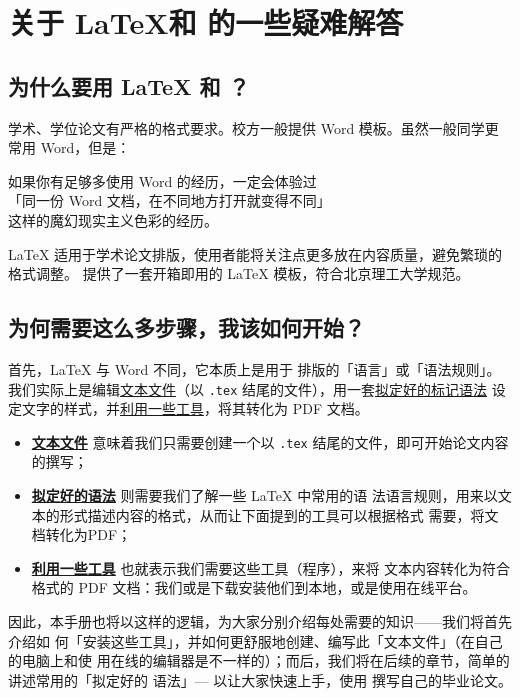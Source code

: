 \chapter{关于 \LaTeX 和 \BIThesis 的一些疑难解答}
\label{chap:what}

\section{为什么要用 \LaTeX{} 和 \BIThesis{}？}

学术、学位论文有严格的格式要求。校方一般提供 Word 模板。虽然一般同学更常用 Word，但是：
\begin{center}
  \kaishu
  如果你有足够多使用 Word 的经历，一定会体验过\\
  「同一份 Word 文档，在不同地方打开就变得不同」\\
  这样的魔幻现实主义色彩的经历。
\end{center}

\LaTeX{} 适用于学术论文排版，使用者能将关注点更多放在内容质量，避免繁琐的格式调整。
\BIThesis{} 提供了一套开箱即用的 \LaTeX{} 模板，符合北京理工大学规范。

\section{为何需要这么多步骤，我该如何开始？}

首先，\LaTeX{} 与 Word 不同，它本质上是用于
排版的「语言」或「语法规则」。我们实际上是编辑\underline{文本文件}（以
\texttt{.tex} 结尾的文件），用一套\underline{拟定好的标记语法}
设定文字的样式，并\underline{利用一些工具}，将其转化为 PDF 文档。

\begin{itemize}[noitemsep]
  \item \textbf{\underline{文本文件}} 意味着我们只需要创建一个以 \texttt{.tex}
  结尾的文件，即可开始论文内容的撰写；
  \item \textbf{\underline{拟定好的语法}} 则需要我们了解一些 \LaTeX{} 中常用的语
  法语言规则，用来以文本的形式描述内容的格式，从而让下面提到的工具可以根据格式
  需要，将文档转化为PDF；
  \item \textbf{\underline{利用一些工具}} 也就表示我们需要这些工具（程序），来将
  文本内容转化为符合格式的 PDF 文档：我们或是下载安装他们到本地，或是使用在线平台。
\end{itemize}

因此，本手册也将以这样的逻辑，为大家分别介绍每处需要的知识——我们将首先介绍如
何「安装这些工具」，并如何更舒服地创建、编写此「文本文件」（在自己的电脑上和使
用在线的编辑器是不一样的）；而后，我们将在后续的章节，简单的讲述常用的「拟定好的
语法」--- 以让大家快速上手，使用 \BIThesis{} 撰写自己的毕业论文。


